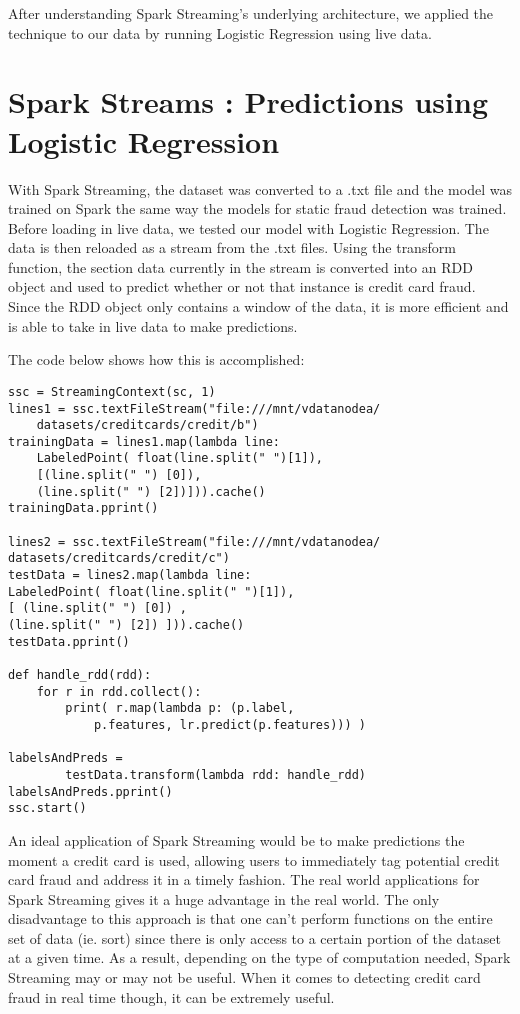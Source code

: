 \documentclass[9pt,twocolumn,twoside]{idsi}
\begin{document}
After understanding Spark Streaming's underlying architecture, we applied the technique to our data by running Logistic Regression using live data. 


\section{Spark Streams : Predictions using Logistic Regression}
With Spark Streaming, the dataset was converted to a .txt file and the model was trained on Spark the same way the models for static fraud detection was trained. Before loading in live data, we tested our model with Logistic Regression. The data is then reloaded as a stream from the .txt files. Using the transform function, the section data currently in the stream is converted into an RDD object and used to predict whether or not that instance is credit card fraud.
Since the RDD object only contains a window of the data, it is more efficient and is able to take in live data to make predictions. 

The code below shows how this is accomplished:

\begin {lstlisting}
ssc = StreamingContext(sc, 1)
lines1 = ssc.textFileStream("file:///mnt/vdatanodea/
	datasets/creditcards/credit/b")
trainingData = lines1.map(lambda line: 
	LabeledPoint( float(line.split(" ")[1]), 
    [(line.split(" ") [0]),
    (line.split(" ") [2])])).cache()
trainingData.pprint()

lines2 = ssc.textFileStream("file:///mnt/vdatanodea/
datasets/creditcards/credit/c")
testData = lines2.map(lambda line: 
LabeledPoint( float(line.split(" ")[1]),
[ (line.split(" ") [0]) , 
(line.split(" ") [2]) ])).cache()
testData.pprint()

def handle_rdd(rdd):
    for r in rdd.collect():
        print( r.map(lambda p: (p.label, 
        	p.features, lr.predict(p.features))) )

labelsAndPreds = 
		testData.transform(lambda rdd: handle_rdd)
labelsAndPreds.pprint()
ssc.start() 
\end{lstlisting}

An ideal application of Spark Streaming would be to make predictions the moment a credit card is used, allowing users to immediately tag potential credit card fraud and address it in a timely fashion. The real world applications for Spark Streaming gives it a huge advantage in the real world. The only disadvantage to this approach is that one can't perform functions on the entire set of data (ie. sort) since there is only access to a certain portion of the dataset at a given time. As a result, depending on the type of computation needed, Spark Streaming may or may not be useful. When it comes to detecting credit card fraud in real time though, it can be extremely useful.  
\end{document}
